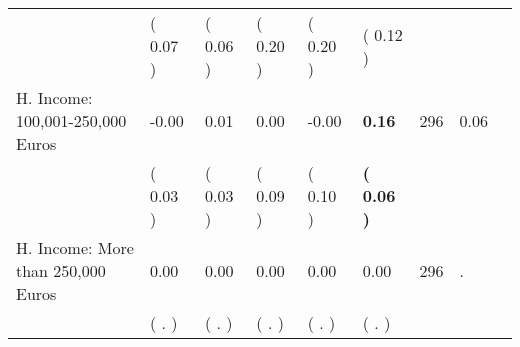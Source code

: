 \begin{tabular}{L{6.2cm} C{1.8cm} C{1.8cm} C{1.8cm} C{1.8cm} C{1.8cm} C{1.8cm} C{0.3cm} C{0.3cm}}
 & (     0.07 ) & (     0.06 ) & (     0.20 ) & (     0.20 ) & (     0.12 )  & \\
H. Income: 100,001-250,000 Euros &     -0.00 &      0.01 &      0.00 &     -0.00 & \textbf{     0.16}  & 296 &       0.06 \\ 
 & (     0.03 ) & (     0.03 ) & (     0.09 ) & (     0.10 ) & \textbf{(     0.06 )}  & \\
H. Income: More than 250,000 Euros &      0.00 &      0.00 &      0.00 &      0.00 &      0.00  & 296 &          . \\ 
 & (        . ) & (        . ) & (        . ) & (        . ) & (        . )  & \\
\bottomrule
\end{tabular}
